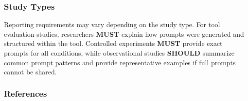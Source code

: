 \documentclass[11pt]{article}
\begin{document}
\subsubsection{Study Types}
Reporting requirements may vary depending on the study type. For tool evaluation studies, researchers \textbf{MUST} explain how prompts were generated and structured within the tool. Controlled experiments \textbf{MUST} provide exact prompts for all conditions, while observational studies \textbf{SHOULD} summarize common prompt patterns and provide representative examples if full prompts cannot be shared.

\subsubsection{References}



\end{document}
